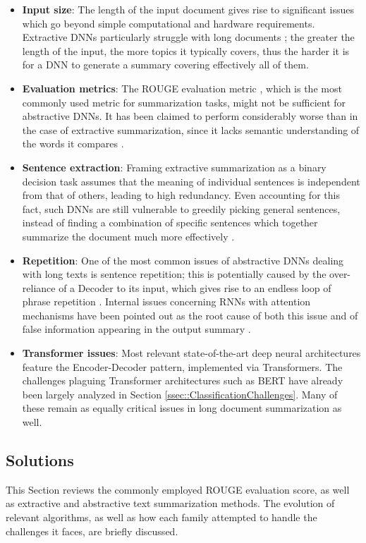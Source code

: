 \documentclass[preprint,review,10pt]{elsarticle}
\begin{document}
	\begin{itemize}
		\item \textbf{Input size}: The length of the input document gives rise to significant issues which go beyond simple computational and hardware requirements. Extractive DNNs particularly struggle with long documents \cite{xiao}; the greater the length of the input, the more topics it typically covers, thus the harder it is for a DNN to generate a summary covering effectively all of them.
		
		\item \textbf{Evaluation metrics}: The ROUGE evaluation metric \cite{rouge}, which is the most commonly used metric for summarization tasks, might not be sufficient for abstractive DNNs. It has been claimed to perform considerably worse than in the case of extractive summarization, since it lacks semantic understanding of the words it compares \cite{akter}.
		
		\item \textbf{Sentence extraction}: Framing extractive summarization as a binary decision task assumes that the meaning of individual sentences is independent from that of others, leading to high redundancy. Even accounting for this fact, such DNNs are still vulnerable to greedily picking general sentences, instead of finding a combination of specific sentences which together summarize the document much more effectively \cite{matchsum}.
		
		\item \textbf{Repetition}: One of the most common issues of abstractive DNNs dealing with long texts is sentence repetition; this is potentially caused by the over-reliance of a Decoder to its input, which gives rise to an endless loop of phrase repetition \cite{abigail}. Internal issues concerning RNNs with attention mechanisms have been pointed out as the root cause of both this issue and of false information appearing in the output summary \cite{suleiman}.
		
		\item \textbf{Transformer issues}: Most relevant state-of-the-art deep neural architectures feature the Encoder-Decoder pattern, implemented via Transformers. The challenges plaguing Transformer architectures such as BERT have already been largely analyzed in Section \ref{ssec::ClassificationChallenges}. Many of these remain as equally critical issues in long document summarization as well.
	\end{itemize}
	
	
	\subsection{Solutions}
	This Section reviews the commonly employed ROUGE evaluation score, as well as extractive and abstractive text summarization methods. The evolution of relevant algorithms, as well as how each family attempted to handle the challenges it faces, are briefly discussed.
	
\end{document}
